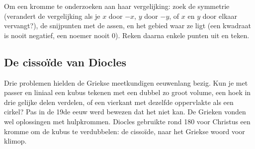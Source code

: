 \begin{werkwijze}
Om een kromme te onderzoeken aan haar vergelijking: zoek de symmetrie (verandert de vergelijking als je $x$ door $-x$, $y$ door $-y$, of $x$ en $y$ door elkaar vervangt?), de snijpunten met de assen, en het gebied waar ze ligt (een kwadraat is nooit negatief, een noemer nooit 0). Reken daarna enkele punten uit en teken.
\end{werkwijze}


\begin{oefeningen}

\end{oefeningen}

\subsection{De cissoïde van Diocles}

Drie problemen hielden de Griekse meetkundigen eeuwenlang bezig. Kun je met passer en liniaal een kubus tekenen met een dubbel zo groot volume, een hoek in drie gelijke delen verdelen, of een vierkant met dezelfde oppervlakte als een cirkel? Pas in de 19de eeuw werd bewezen dat het niet kan. De Grieken vonden wel oplossingen met hulpkrommen. Diocles gebruikte rond 180 voor Christus een kromme om de kubus te verdubbelen: de cissoïde, naar het Griekse woord voor klimop.

